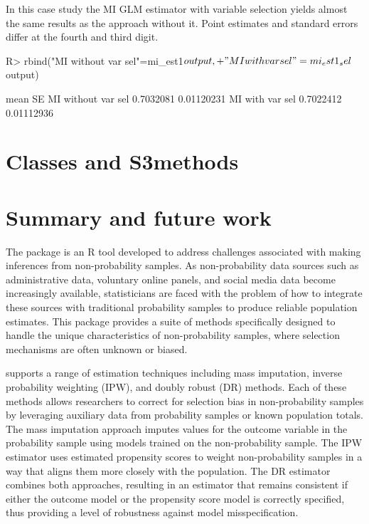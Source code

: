 \documentclass[
]{jss}
\begin{document}
In this case study the MI GLM estimator with variable selection yields
almost the same results as the approach without it. Point estimates and
standard errors differ at the fourth and third digit.

\begin{CodeChunk}
\begin{CodeInput}
R> rbind("MI without var sel"=mi_est1$output,
+       "MI with var sel"=mi_est1_sel$output)
\end{CodeInput}
\begin{CodeOutput}
                        mean         SE
MI without var sel 0.7032081 0.01120231
MI with var sel    0.7022412 0.01112936
\end{CodeOutput}
\end{CodeChunk}

\section{Classes and S3methods}\label{sec-s3methods}

\section{Summary and future work}\label{summary-and-future-work}

The  package is an R tool developed to address
challenges associated with making inferences from non-probability
samples. As non-probability data sources such as administrative data,
voluntary online panels, and social media data become increasingly
available, statisticians are faced with the problem of how to integrate
these sources with traditional probability samples to produce reliable
population estimates. This package provides a suite of methods
specifically designed to handle the unique characteristics of
non-probability samples, where selection mechanisms are often unknown or
biased.

 supports a range of estimation techniques including
mass imputation, inverse probability weighting (IPW), and doubly robust
(DR) methods. Each of these methods allows researchers to correct for
selection bias in non-probability samples by leveraging auxiliary data
from probability samples or known population totals. The mass imputation
approach imputes values for the outcome variable in the probability
sample using models trained on the non-probability sample. The IPW
estimator uses estimated propensity scores to weight non-probability
samples in a way that aligns them more closely with the population. The
DR estimator combines both approaches, resulting in an estimator that
remains consistent if either the outcome model or the propensity score
model is correctly specified, thus providing a level of robustness
against model misspecification.
\end{document}
